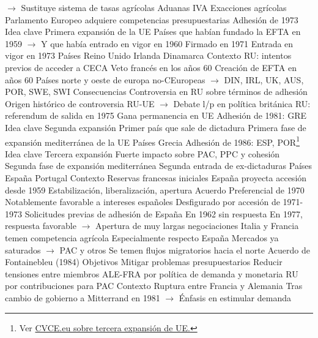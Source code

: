 \documentclass{nuevotema}
\begin{document}
\begin{esquemal}
				\4[] $\to$ Sustituye sistema de tasas agrícolas
				\4[] Aduanas
				\4[] IVA
				\4[] Exacciones agrícolas
				\4 Parlamento Europeo adquiere competencias presupuestarias
		\2 Adhesión de 1973
			\3 Idea clave
				\4 Primera expansión de la UE
				\4 Países que habían fundado la EFTA en 1959
				\4[] $\to$ Y que había entrado en vigor en 1960
				\4 Firmado en 1971
				\4 Entrada en vigor en 1973
			\3 Países
				\4 Reino Unido
				\4 Irlanda
				\4 Dinamarca
			\3 Contexto
				\4 RU: intentos previos de acceder a CECA
				\4[] Veto francés en los años 60
				\4 Creación de EFTA en años 60
				\4[] Países norte y oeste de europa no-CEuropeas
				\4[] $\to$ DIN, IRL, UK, AUS, POR, SWE, SWI
			\3 Consecuencias
				\4 Controversia en RU sobre términos de adhesión
				\4[] Origen histórico de controversia RU-UE
				\4[] $\to$ Debate l/p en política británica
				\4 RU: referendum de salida en 1975
				\4[] Gana permanencia en UE
		\2 Adhesión de 1981: GRE
			\3 Idea clave
				\4 Segunda expansión
				\4 Primer país que sale de dictadura
				\4 Primera fase de expansión mediterránea de la UE
			\3 Países
				\4 Grecia
		\2 Adhesión de 1986: ESP, POR\footnote{Ver \href{https://www.cvce.eu/en/education/unit-content/-/unit/02bb76df-d066-4c08-a58a-d4686a3e68ff/d4c04734-67dc-4e67-8168-1f996b10672f}{CVCE.eu sobre tercera expansión de UE.}}
			\3 Idea clave
				\4 Tercera expansión
				\4 Fuerte impacto sobre PAC, PPC y cohesión
				\4 Segunda fase de expansión mediterránea
				\4 Segunda entrada de ex-dictaduras
			\3 Países
				\4 España
				\4 Portugal
			\3 Contexto
				\4 Reservas francesas iniciales
				\4 España proyecta accesión desde 1959
				\4[] Estabilización, liberalización, apertura
				\4 Acuerdo Preferencial de 1970
				\4[] Notablemente favorable a intereses españoles
				\4[] Desfigurado por accesión de 1971-1973
				\4 Solicitudes previas de adhesión de España
				\4[] En 1962 sin respuesta
				\4[] En 1977, respuesta favorable
				\4[] $\to$ Apertura de muy largas negociaciones
				\4 Italia y Francia temen competencia agrícola
				\4[] Especialmente respecto España
				\4[] Mercados ya saturados
				\4[] $\to$ PAC y otros
				\4[] Se temen flujos migratorios hacia el norte
		\2 Acuerdo de Fontainebleu (1984)
			\3 Objetivos
				\4 Mitigar problemas presupuestarios
				\4 Reducir tensiones entre miembros
				\4[] ALE-FRA por política de demanda y monetaria
				\4[] RU por contribuciones para PAC
			\3 Contexto
				\4 Ruptura entre Francia y Alemania
				\4[] Tras cambio de gobierno a Mitterrand en 1981
				\4[] $\to$ Énfasis en estimular demanda

\end{esquemal}
\end{document}
